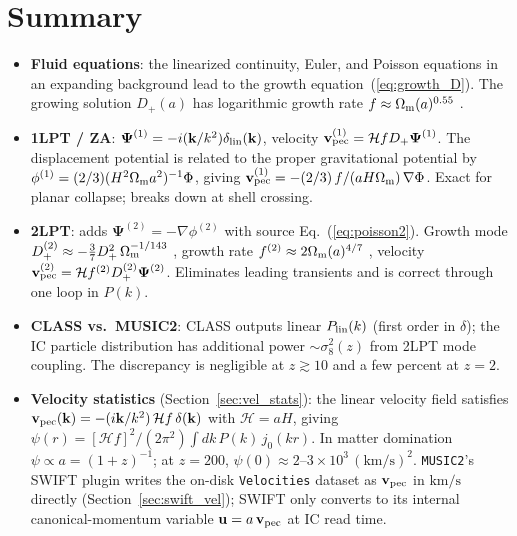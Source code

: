 \documentclass[12pt]{article}
\newcommand{\bk}{\mathbf{k}}
\newcommand{\bPsi}{\boldsymbol{\Psi}}
\newcommand{\bv}{\mathbf{v}}
\newcommand{\Dp}{D_+}
\newcommand{\Dpp}{D_+^{(2)}}
\newcommand{\Omm}{\Omega_{\rm m}}
\newcommand{\calH}{\mathcal{H}}
\begin{document}
\section{Summary}

\begin{itemize}
  \item \textbf{Fluid equations}: the linearized continuity, Euler, and
        Poisson equations in an expanding background lead to the growth
        equation~(\ref{eq:growth_D}).  The growing solution $\Dp(a)$
        has logarithmic growth rate $f \approx \Omm(a)^{0.55}$
        \citep{Linder2005}.

  \item \textbf{1LPT / ZA}: $\bPsi^{(1)} = -i(\bk/k^2)\delta_{\rm lin}(\bk)$,
        velocity $\bv_{\rm pec}^{(1)} = \calH f\Dp\bPsi^{(1)}$.
        The displacement potential is related to the proper gravitational
        potential by $\phi^{(1)} = (2/3)(H^2\Omm a^2)^{-1}\Phi$,
        giving $\bv_{\rm pec}^{(1)} = -(2/3)\,f/(aH\Omm)\,\nabla\Phi$.
        Exact for planar collapse; breaks down at shell crossing.

  \item \textbf{2LPT}: adds $\bPsi^{(2)} = -\nabla\phi^{(2)}$ with source
        Eq.~(\ref{eq:poisson2}).  Growth mode
        $\Dpp \approx -\tfrac{3}{7}\Dp^2\,\Omm^{-1/143}$
        \citep{Crocce2006}, growth rate $f^{(2)} \approx 2\Omm(a)^{4/7}$
        \citep{Bouchet1995}, velocity
        $\bv_{\rm pec}^{(2)} = \calH f^{(2)}\Dpp\bPsi^{(2)}$.
        Eliminates leading transients and is correct through one loop
        in $P(k)$.

  \item \textbf{CLASS vs.\ MUSIC2}: CLASS outputs linear $P_{\rm lin}(k)$
        (first order in $\delta$); the IC particle distribution has
        additional power $\sim\sigma_8^2(z)$ from 2LPT mode coupling.
        The discrepancy is negligible at $z \gtrsim 10$ and a few percent
        at $z = 2$.

  \item \textbf{Velocity statistics} (Section~\ref{sec:vel_stats}):
        the linear velocity field satisfies
        $\bv_{\rm pec}(\bk) = -(i\bk/k^2)\,\calH f\,\delta(\bk)$ with
        $\calH = aH$, giving
        $\psi(r) = [\calH f]^2/(2\pi^2)\int dk\,P(k)\,j_0(kr)$.  In
        matter domination $\psi \propto a = (1+z)^{-1}$; at $z=200$,
        $\psi(0) \approx 2\text{--}3 \times 10^3\,(\mathrm{km/s})^2$.
        \texttt{MUSIC2}'s SWIFT plugin writes the on-disk
        \texttt{Velocities} dataset as $\bv_{\rm pec}$ in $\mathrm{km/s}$
        directly (Section~\ref{sec:swift_vel}); SWIFT only converts to
        its internal canonical-momentum variable
        $\mathbf{u} = a\,\bv_{\rm pec}$ at IC read time.
\end{itemize}
\end{document}

